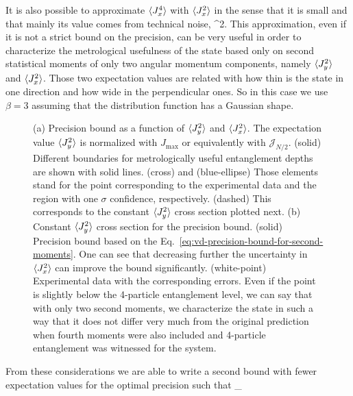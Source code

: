 It is also possible to approximate $\langle{J_x^4}\rangle$ with $\expect{J_x^2}$ in the sense that it is small and that mainly its value comes from technical noise,
\be
   \approx \beta {}^2.
\ee
This approximation, even if it is not a strict bound on the precision, can be very useful in order to characterize the metrological usefulness of the state based only on second statistical moments of only two angular momentum components, namely $\expect{J_y^2}$ and $\expect{J_x^2}$.
Those two expectation values are related with how  thin is the state in one direction and how wide in the perpendicular ones.
So in this case we use $\beta=3$ assuming that the distribution function has a Gaussian shape.

\begin{figure}[htp]
  \centering
  \caption[(a) Precision bound as a function of $\expect{J_y^2}$ and $\expect{J_x^2}$. (b) Precision bound for constant $\expect{J_y^2}$.]{  (a) Precision bound as a function of $\expect{J_y^2}$ and $\expect{J_x^2}$.
  The expectation value $\expect{J_y^2}$ is normalized with $J_{\max}$ or equivalently with $\mathcal{J}_{N/2}$.
  (solid) Different boundaries for metrologically useful entanglement depths are shown with solid lines.
  (cross) and (blue-ellipse) Those elements stand for the point corresponding to the experimental data and the region with one $\sigma$ confidence, respectively.
  (dashed) This corresponds to the constant $\expect{J_y^2}$ cross section plotted next.
  (b) Constant $\expect{J_y^2}$ cross section for the precision bound.
  (solid) Precision bound based on the Eq.~\eqref{eq:vd-precision-bound-for-second-moments}.
  One can see that decreasing further the uncertainty in $\expect{J_x^2}$ can improve the bound significantly.
  (white-point) Experimental data with the corresponding errors.
  Even if the point is slightly below the 4-particle entanglement level, we can say that with only two second moments, we characterize the state in such a way that it does not differ very much from the original prediction when fourth moments were also included and 4-particle entanglement was witnessed for the system.}
  \label{fig:vd-experimental}
\end{figure}
From these considerations we are able to write a second bound with fewer expectation values for the optimal precision such that
\be
  \varian{\theta}_{} \leqslant {}
